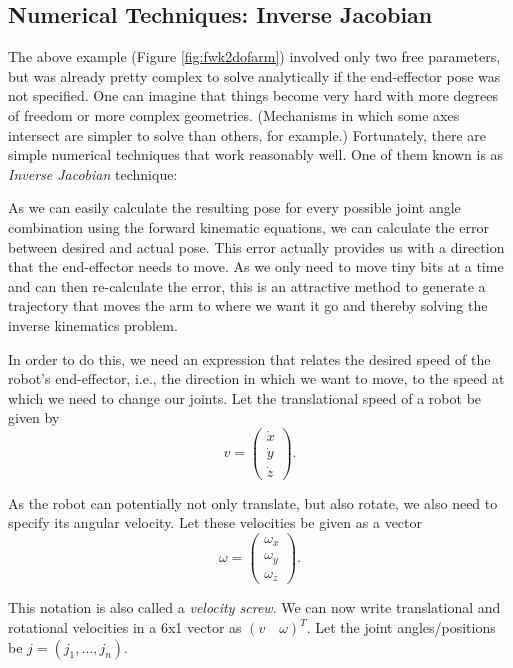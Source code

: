 \subsection{Numerical Techniques: Inverse Jacobian}\label{sec:invjac}
The above example (Figure \ref{fig:fwk2dofarm}) involved only two free parameters, but was already pretty complex to solve analytically if the end-effector pose was not specified. One can imagine that things become very hard with more degrees of freedom or more complex geometries. (Mechanisms in which some axes intersect are simpler to solve than others, for example.) Fortunately, there are simple numerical techniques that work reasonably well. One of them known is as \emph{Inverse Jacobian} technique:

As we can easily calculate the resulting pose for every possible joint angle combination using the forward kinematic equations, we can calculate the error between desired and actual pose. This error actually provides us with a direction that the end-effector needs to move. As we only need to move tiny bits at a time and can then re-calculate the error, this is an attractive method to generate a trajectory that moves the arm to where we want it go and thereby solving the inverse kinematics problem.

In order to do this, we need an expression that relates the desired speed of the robot's end-effector, i.e., the direction in which we want to move, to the speed at which we need to change our joints. Let the translational speed of a robot be given by 
\begin{equation}
v=\left(\begin{array}{c}
\dot{x}\\
\dot{y}\\
\dot{z}
\end{array}
\right).
\end{equation}

 As the robot can potentially not only translate, but also rotate, we also need to specify its angular velocity. Let these velocities be given as a vector 
\begin{equation}
\omega=\left(\begin{array}{c}
\omega_x\\
\omega_y\\
\omega_z
\end{array}
\right).
\end{equation}

This notation is also called a \emph{velocity screw}. %
We can now write translational and rotational velocities in a 6x1 vector as $ (v \quad \omega)^T$. Let the joint angles/positions be $j=(j_1, \ldots, j_n)$.

